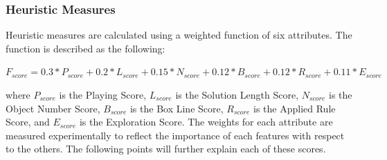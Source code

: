 \documentclass[letterpaper]{article}
\begin{document}
\subsubsection{Heuristic Measures}\label{Section:levelScoreEquation}
Heuristic measures are calculated using a weighted function of six attributes. The function is described as the following:
\begin{center}$F_{score} = 0.3 * P_{score} + 0.2 * L_{score} + 0.15 * N_{score} + 0.12 * B_{score} + 0.12 * R_{score} + 0.11 * E_{score}$\end{center}
where $P_{score}$ is the Playing Score, $L_{score}$ is the Solution Length Score, $N_{score}$ is the Object Number Score, $B_{score}$ is the Box Line Score, $R_{score}$ is the Applied Rule Score, and $E_{score}$ is the Exploration Score. The weights for each attribute are measured experimentally to reflect the importance of each features with respect to the others. The following points will further explain each of these scores.
\end{document}
